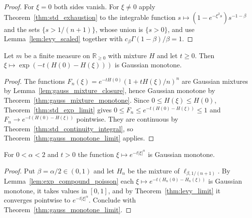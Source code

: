\begin{proof}
\leanok
For $\xi = 0$ both sides vanish. For $\xi \ne 0$ apply Theorem~\ref{thm:std_exhaustion} to the integrable function $s \mapsto (1 - e^{-\xi^2 s}) s^{-1-\beta}$ and the sets $\{s > 1/(n+1)\}$, whose union is $\{s > 0\}$, and use Lemma~\ref{lem:levy_scaled} together with $c_\beta \Gamma(1 - \beta)/\beta = 1$.
\end{proof}

\begin{lemma}\label{lem:exp_compound_poisson}
\leanok
Let $m$ be a finite measure on $\mathbb{R}_{\ge 0}$ with mixture $H$ and let $t \ge 0$. Then $\xi \mapsto \exp(-t (H(0) - H(\xi)))$ is Gaussian monotone.
\end{lemma}

\begin{proof}
\leanok
The functions $F_n(\xi) = e^{-t H(0)} (1 + t H(\xi)/n)^n$ are Gaussian mixtures by Lemma~\ref{lem:gauss_mixture_closure}, hence Gaussian monotone by Theorem~\ref{thm:gauss_mixture_monotone}. Since $0 \le H(\xi) \le H(0)$, Theorem~\ref{thm:std_exp_limit} gives $0 \le F_n \le e^{-t(H(0) - H(\xi))} \le 1$ and $F_n \to e^{-t(H(0) - H(\xi))}$ pointwise. They are continuous by Theorem~\ref{thm:std_continuity_integral}, so Theorem~\ref{thm:gauss_monotone_limit} applies.
\end{proof}

\begin{theorem}\label{thm:stable_symbol_monotone}
\leanok
For $0 < \alpha < 2$ and $t > 0$ the function $\xi \mapsto e^{-t \lvert \xi \rvert^\alpha}$ is Gaussian monotone.
\end{theorem}

\begin{proof}
\leanok
Put $\beta = \alpha / 2 \in (0, 1)$ and let $H_n$ be the mixture of $\ell_{\beta, 1/(n+1)}$. By Lemma~\ref{lem:exp_compound_poisson} each $\xi \mapsto e^{-t(H_n(0) - H_n(\xi))}$ is Gaussian monotone, it takes values in $[0, 1]$, and by Theorem~\ref{thm:levy_limit} it converges pointwise to $e^{-t \lvert \xi \rvert^\alpha}$. Conclude with Theorem~\ref{thm:gauss_monotone_limit}.
\end{proof}
